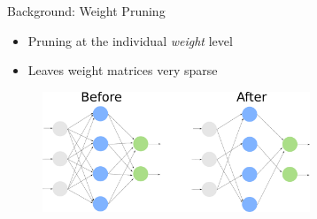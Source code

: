 \documentclass[xcolor=dvipsnames]{beamer}
\begin{document}











\begin{frame}{Background: Weight Pruning}

\begin{itemize}
    \item Pruning at the individual \textit{weight} level
    \item Leaves weight matrices very sparse
\end{itemize}

\begin{figure}
    \centering
    \includegraphics[width=8cm]{images/weight_pruning.pdf}
\end{figure}

\end{frame}
\end{document}
